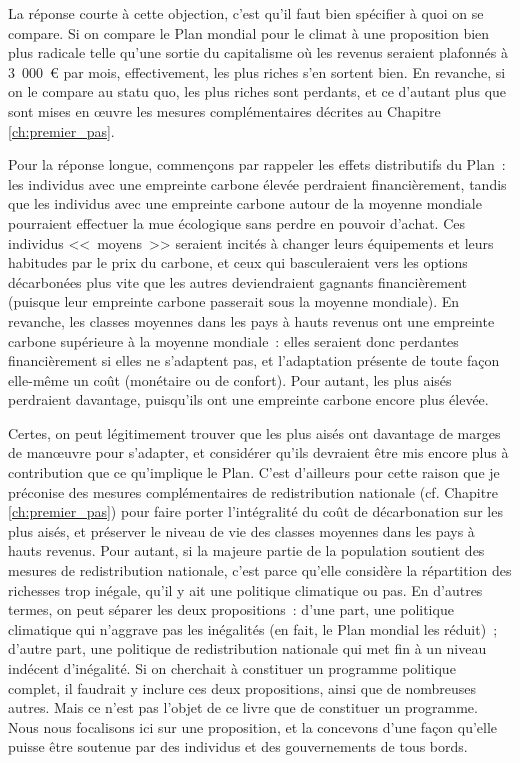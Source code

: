 \documentclass[a5paper,french,openany]{memoir}
\begin{document}
La réponse courte à cette objection, c'est qu'il faut bien spécifier à quoi on se compare. Si on compare le Plan mondial pour le climat à une proposition bien plus radicale telle qu'une sortie du capitalisme où les revenus seraient plafonnés à 3~000~\euro{} par mois, effectivement, les plus riches s'en sortent bien. En revanche, si on le compare au statu quo, les plus riches sont perdants, et ce d'autant plus que sont mises en œuvre les mesures complémentaires décrites au Chapitre \ref{ch:premier_pas}. 

Pour la réponse longue, commençons par rappeler les effets distributifs du Plan~: les individus avec une empreinte carbone élevée perdraient financièrement, tandis que les individus avec une empreinte carbone autour de la moyenne mondiale pourraient effectuer la mue écologique sans perdre en pouvoir d'achat. Ces individus <<~moyens~>> seraient incités à changer leurs équipements et leurs habitudes par le prix du carbone, et ceux qui basculeraient vers les options décarbonées plus vite que les autres deviendraient gagnants financièrement (puisque leur empreinte carbone passerait sous la moyenne mondiale). En revanche, les classes moyennes dans les pays à hauts revenus ont une empreinte carbone supérieure à la moyenne mondiale~: elles seraient donc perdantes financièrement si elles ne s'adaptent pas, et l'adaptation présente de toute façon elle-même un coût (monétaire ou de confort). Pour autant, les plus aisés perdraient davantage, puisqu'ils ont une empreinte carbone encore plus élevée. 

Certes, on peut légitimement trouver que les plus aisés ont davantage de marges de manœuvre pour s'adapter, et considérer qu'ils devraient être mis encore plus à contribution que ce qu'implique le Plan. C'est d'ailleurs pour cette raison que je préconise des mesures complémentaires de redistribution nationale (cf. Chapitre \ref{ch:premier_pas}) pour faire porter l'intégralité du coût de décarbonation sur les plus aisés, et préserver le niveau de vie des classes moyennes dans les pays à hauts revenus. Pour autant, si la majeure partie de la population soutient des mesures de redistribution nationale, c'est parce qu'elle considère la répartition des richesses trop inégale, qu'il y ait une politique climatique ou pas. En d'autres termes, on peut séparer les deux propositions~: d'une part, une politique climatique qui n'aggrave pas les inégalités (en fait, le Plan mondial les réduit)~; d'autre part, une politique de redistribution nationale qui met fin à un niveau indécent d'inégalité. Si on cherchait à constituer un programme politique complet, il faudrait y inclure ces deux propositions, ainsi que de nombreuses autres. Mais ce n'est pas l'objet de ce livre que de constituer un programme. Nous nous focalisons ici sur une proposition, et la concevons d'une façon qu'elle puisse être soutenue par des individus et des gouvernements de tous bords. 
\end{document}
